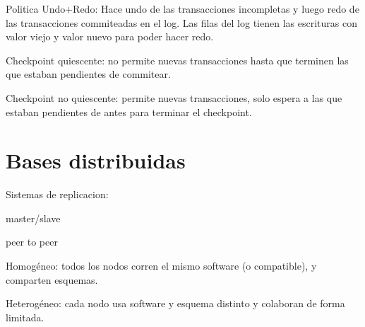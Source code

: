 Politica Undo+Redo: Hace undo de las transacciones incompletas y luego redo de las transacciones commiteadas en el log. Las filas del log tienen las escrituras con valor viejo y valor nuevo para poder hacer redo.

Checkpoint quiescente: no permite nuevas transacciones hasta que terminen las que estaban pendientes de commitear.

Checkpoint no quiescente: permite nuevas transacciones, solo espera a las que estaban pendientes de antes para terminar el checkpoint.

\section{Bases distribuidas}

Sistemas de replicacion:

master/slave

peer to peer

Homogéneo: todos los nodos corren el mismo software (o compatible), y comparten esquemas.

Heterogéneo: cada nodo usa software y esquema distinto y colaboran de forma limitada.
